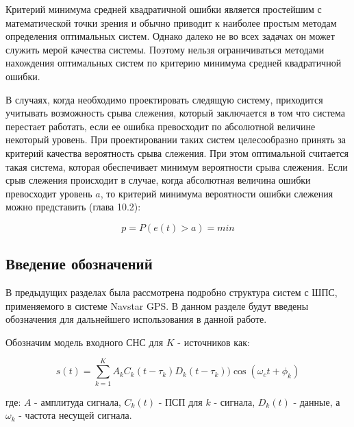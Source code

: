 Критерий минимума средней квадратичной ошибки является простейшим с математической точки зрения и обычно приводит
к наиболее простым методам определения оптимальных систем. Однако далеко не во всех задачах он может служить мерой
качества системы. Поэтому нельзя ограничиваться методами нахождения оптимальных систем по критерию минимума средней
квадратичной ошибки.

В случаях, когда необходимо проектировать следящую систему, приходится учитывать возможность срыва слежения,
который заключается в том что система перестает работать, если ее ошибка превосходит по абсолютной величине некоторый
уровень. При проектировании таких систем целесообразно принять за критерий качества вероятность срыва слежения. При
этом оптимальной считается такая система, которая обеспечивает минимум вероятности срыва слежения. Если срыв слежения
происходит в случае, когда абсолютная величина ошибки превосходит уровень $a$, то критерий минимума вероятности ошибки
слежения можно представить \cite{pugachev} (глава 10.2):
\begin{center}
\begin{equation}
	\label{eq:prob_lost_signal}
	p = P(e(t) > a) = min
\end{equation}
\end{center}



\subsection{Введение обозначений}
В предыдущих разделах была рассмотрена подробно структура систем с ШПС, применяемого в системе Navstar GPS. В данном разделе
будут введены обозначения для дальнейшего использования в данной работе.

Обозначим модель входного СНС для ${K}$ - источников как:
\begin{center}
\begin{equation}
	\label{eq:gps_model_1}
	s(t) = \sum_{k=1}^{K}{A_{k}C_{k}(t-\tau_k)D_{k}(t-\tau_k))\cos(\omega_{c}t + \phi_k)}
\end{equation}
\end{center}
где: ${A}$ - амплитуда сигнала, ${C_k(t)}$ - ПСП для ${k}$ - сигнала, ${D_k(t)}$ - данные, а ${\omega_{k}}$ - частота несущей сигнала.

